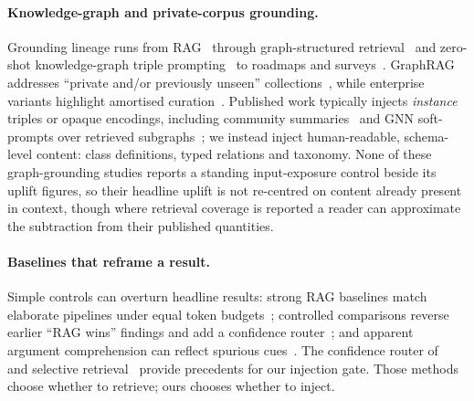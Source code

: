 \documentclass[10pt,twocolumn]{article}
\begin{document}
\paragraph{Knowledge-graph and private-corpus grounding.}
Grounding lineage runs from RAG~\cite{lewis2020rag} through graph-structured retrieval~\cite{edge2024graphrag,guo2024lightrag} and zero-shot knowledge-graph triple prompting~\cite{baek2023kaping} to roadmaps and surveys~\cite{pan2024unifying,peng2024graphragsurvey}. GraphRAG addresses ``private and/or previously unseen'' collections~\cite{edge2024graphrag}, while enterprise variants highlight amortised curation~\cite{min2025practicalgraphrag}. Published work typically injects \emph{instance} triples or opaque encodings, including community summaries~\cite{edge2024graphrag} and GNN soft-prompts over retrieved subgraphs~\cite{he2024gretriever}; we instead inject human-readable, schema-level content: class definitions, typed relations and taxonomy. None of these graph-grounding studies reports a standing input-exposure control beside its uplift figures, so their headline uplift is not re-centred on content already present in context, though where retrieval coverage is reported a reader can approximate the subtraction from their published quantities.

\paragraph{Baselines that reframe a result.}
Simple controls can overturn headline results: strong RAG baselines match elaborate pipelines under equal token budgets~\cite{laitenberger2025stronger}; controlled comparisons reverse earlier ``RAG wins'' findings and add a confidence router~\cite{li2024ragorlongcontext}; and apparent argument comprehension can reflect spurious cues~\cite{niven2019probing}. The confidence router of~\textcite{li2024ragorlongcontext} and selective retrieval~\cite{asai2024selfrag,jeong2024adaptiverag,mallen2023trust} provide precedents for our injection gate. Those methods choose whether to retrieve; ours chooses whether to inject.
\end{document}
